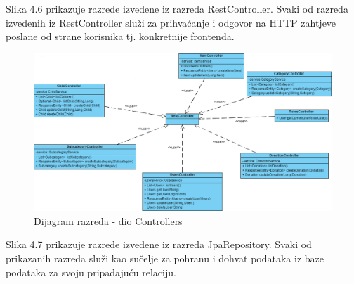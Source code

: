 			\eject

			Slika 4.6 prikazuje razrede izvedene iz razreda RestController. Svaki od razreda izvedenih iz RestController služi za prihvaćanje i odgovor na HTTP zahtjeve poslane od strane korisnika tj. konkretnije frontenda.\\[10pt]

			\begin{figure}[H]
				\includegraphics[width=\textwidth,height=0.4\textheight]{dijagrami/Controlleri.png}
				\centering
				\caption{Dijagram razreda - dio Controllers}
				\label{fig:Controllers}
			\end{figure}

			\eject

			Slika 4.7 prikazuje razrede izvedene iz razreda JpaRepository. Svaki od prikazanih razreda služi kao sučelje za pohranu i dohvat podataka iz baze podataka za svoju pripadajuću relaciju.\\[10pt]

